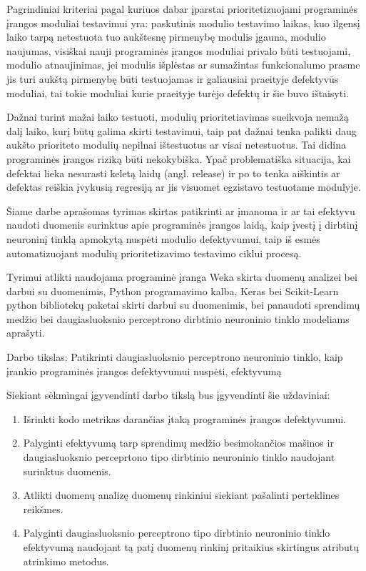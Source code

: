 \documentclass{VUMIFPSbakalaurinis}
\begin{document}
Pagrindiniai kriteriai pagal kuriuos dabar įparstai prioritetizuojami programinės įrangos moduliai testavimui yra: paskutinis modulio testavimo laikas, kuo ilgensį laiko tarpą netestuota tuo aukštesnę pirmenybę modulis įgauna, modulio naujumas, visiškai nauji programinės įrangos moduliai privalo būti testuojami, modulio atnaujinimas, jei modulis išplėstas ar sumažintas funkcionalumo prasme jis turi aukštą pirmenybę būti testuojamas ir galiausiai praeityje defektyvūs moduliai, tai tokie moduliai kurie praeityje turėjo defektų ir šie buvo ištaisyti.

Dažnai turint mažai laiko testuoti, modulių prioritetiavimas sueikvoja nemažą dalį laiko, kurį būtų galima skirti testavimui, taip pat dažnai tenka palikti daug aukšto prioriteto modulių nepilnai ištestuotus ar visai netestuotus. Tai didina programinės įrangos riziką būti nekokybiška. Ypač problematiška situacija, kai defektai lieka nesurasti keletą laidų (angl. release) ir po to tenka aiškintis ar defektas reiškia įvykusią regresiją ar jis visuomet egzistavo testuotame modulyje.

Šiame darbe aprašomas tyrimas skirtas patikrinti ar įmanoma ir ar tai efektyvu naudoti duomenis surinktus apie programinės įrangos laidą, kaip įvestį į dirbtinį neuroninį tinklą apmokytą nuspėti modulio defektyvumui, taip iš esmės automatizuojant modulių prioritetizavimo testavimo ciklui procesą.

Tyrimui atlikti naudojama programinė įranga Weka skirta duomenų analizei bei darbui su duomenimis, Python programavimo kalba, Keras bei Scikit-Learn python bibliotekų paketai skirti darbui su duomenimis, bei panaudoti sprendimų medžio bei daugiasluoksnio perceptrono dirbtinio neuroninio tinklo modeliams aprašyti.

Darbo tikslas: Patikrinti daugiasluoksnio perceptrono neuroninio tinklo, kaip įrankio programinės įrangos defektyvumui nuspėti, efektyvumą

Siekiant sėkmingai įgyvendinti darbo tikslą bus įgyvendinti šie uždaviniai:
\begin{enumerate}
\item Išrinkti kodo metrikas darančias įtaką programinės įrangos defektyvumui.
\item Palyginti efektyvumą tarp sprendimų medžio besimokančios mašinos ir daugiasluoksnio perceprtono tipo dirbtinio neuroninio tinklo naudojant surinktus duomenis.
\item Atlikti duomenų analizę duomenų rinkiniui siekiant pašalinti perteklines reikšmes.
\item Palyginti daugiasluoksnio perceptrono tipo dirbtinio neuroninio tinklo efektyvumą naudojant tą patį duomenų rinkinį pritaikius skirtingus atributų atrinkimo metodus.
\end{enumerate}
\end{document}
